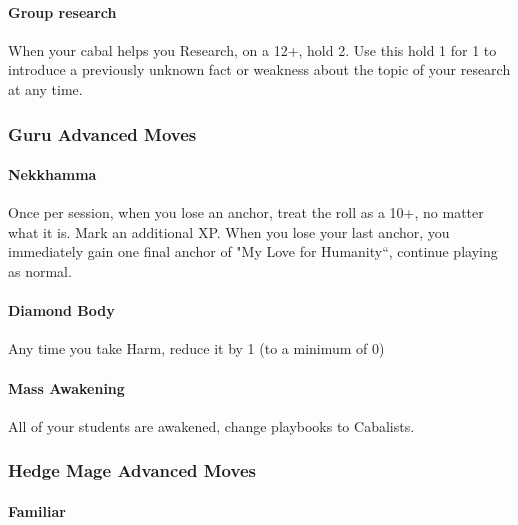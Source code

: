 \documentclass[
]{memoir}
\begin{document}
\hypertarget{group-research}{%
\paragraph{Group research}\label{group-research}}

When your cabal helps you Research, on a 12+, hold 2. Use this hold 1
for 1 to introduce a previously unknown fact or weakness about the topic
of your research at any time.

\hypertarget{guru-advanced-moves}{%
\subsubsection{Guru Advanced Moves}\label{guru-advanced-moves}}

\hypertarget{nekkhamma}{%
\paragraph{Nekkhamma}\label{nekkhamma}}

Once per session, when you lose an anchor, treat the roll as a 10+, no
matter what it is. Mark an additional XP. When you lose your last
anchor, you immediately gain one final anchor of "My Love for
Humanity``, continue playing as normal.

\hypertarget{diamond-body}{%
\paragraph{Diamond Body}\label{diamond-body}}

Any time you take Harm, reduce it by 1 (to a minimum of 0)

\hypertarget{mass-awakening}{%
\paragraph{Mass Awakening}\label{mass-awakening}}

All of your students are awakened, change playbooks to Cabalists.

\hypertarget{hedge-mage-advanced-moves}{%
\subsubsection{Hedge Mage Advanced
Moves}\label{hedge-mage-advanced-moves}}

\hypertarget{familiar}{%
\paragraph{Familiar}\label{familiar}}
\end{document}
